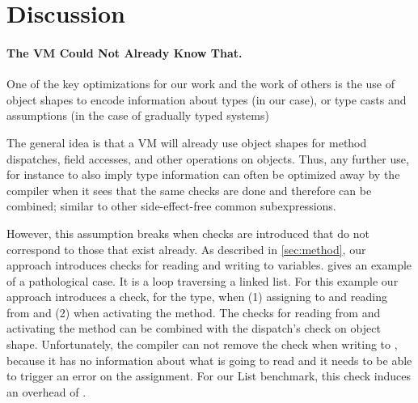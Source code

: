 
\section{Discussion}
\label{sec:discussion}

\paragraph{The VM Could Not Already Know That.}
\label{sec:disc-pathological-case}



One of the key optimizations for our work
and the work of others\citep{Richards2017,Bauman2017}
is the use of object shapes
to encode information about types
(in our case),
or type casts and assumptions
(in the case of gradually typed systems)

The general idea is that a VM will already use object shapes
for method dispatches, field accesses, and other operations on objects.
Thus, any further use, for instance to also imply type information
can often be optimized away
by the compiler when it sees that the same checks are done
and therefore can be combined; similar to 
other side-effect-free common subexpressions.

However, this assumption breaks when checks are introduced
that do not correspond to those that exist already.
As described in \cref{sec:method},
our approach introduces checks for reading and writing to variables.
 gives an example of a pathological case.
It is a loop traversing a linked list.
For this example our approach 
introduces a check, for the  type,
when (1) assigning to and reading from  and
(2) when activating the  method.
The checks for reading from  and activating the method can be
combined with the dispatch's check on object shape.
%
Unfortunately, the compiler can not remove the check
when writing to , because it has no information about
what  is going to read and it needs to be able to trigger an error
on the assignment.
For our List benchmark, this check induces an overhead of \OverheadListP.

